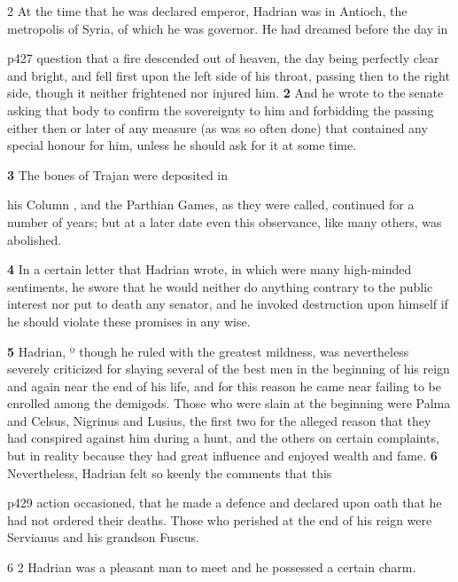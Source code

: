 2 At the time that he was declared emperor, Hadrian was in Antioch, the metropolis of Syria, of which he was governor. He had dreamed before the day in

p427 question that a fire descended out of heaven, the day being perfectly clear and bright, and fell first upon the left side of his throat, passing then to the right side, though it neither frightened nor injured him. \textbf{2} And he wrote to the senate asking that body to confirm the sovereignty to him and forbidding the passing either then or later of any measure (as was so often done) that contained any special honour for him, unless he should ask for it at some time.

\textbf{3} The bones of Trajan were deposited in

his Column , and the Parthian Games, as they were called, continued for a number of years; but at a later date even this observance, like many others, was abolished.

\textbf{4} In a certain letter that Hadrian wrote, in which were many high-minded sentiments, he swore that he would neither do anything contrary to the public interest nor put to death any senator, and he invoked destruction upon himself if he should violate these promises in any wise.

\textbf{5} Hadrian, º though he ruled with the greatest mildness, was nevertheless severely criticized for slaying several of the best men in the beginning of his reign and again near the end of his life, and for this reason he came near failing to be enrolled among the demigods. Those who were slain at the beginning were Palma and Celsus, Nigrinus and Lusius, the first two for the alleged reason that they had conspired against him during a hunt, and the others on certain complaints, but in reality because they had great influence and enjoyed wealth and fame. \textbf{6} Nevertheless, Hadrian felt so keenly the comments that this

p429 action occasioned, that he made a defence and declared upon oath that he had not ordered their deaths. Those who perished at the end of his reign were Servianus and his grandson Fuscus.

6 2 Hadrian was a pleasant man to meet and he possessed a certain charm.

